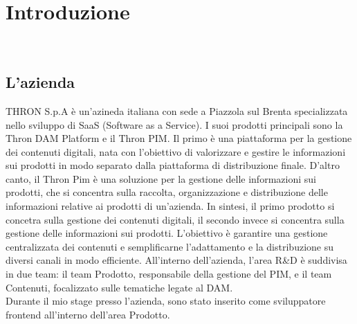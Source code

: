 \chapter{Introduzione}
\label{cap:introduzione}




\\


\section{L'azienda}

THRON S.p.A è un'azineda italiana con sede a Piazzola sul Brenta specializzata nello sviluppo di SaaS (Software as a Service).
I suoi prodotti principali sono la Thron DAM Platform e il Thron PIM. 
Il primo è una piattaforma per la gestione dei contenuti digitali, nata con l'obiettivo di valorizzare e gestire le informazioni 
sui prodotti in modo separato dalla piattaforma di distribuzione finale.
D'altro canto, il Thron Pim è una soluzione per la gestione delle informazioni sui prodotti, che si concentra
sulla raccolta, organizzazione e distribuzione delle informazioni relative ai prodotti di un'azienda.
In sintesi, il primo prodotto si concetra sulla gestione dei contenuti digitali, il secondo invece
si concentra sulla gestione delle informazioni sui prodotti.
L'obiettivo è garantire una gestione centralizzata dei contenuti e semplificarne l'adattamento e la distribuzione su diversi
canali in modo efficiente.
All'interno dell'azienda, l'area R\&D è suddivisa in due team: il team Prodotto, responsabile della gestione
del PIM, e il team Contenuti, focalizzato sulle tematiche legate al DAM.\\
Durante il mio stage presso l'azienda, sono stato inserito come sviluppatore frontend all'interno dell'area Prodotto.

